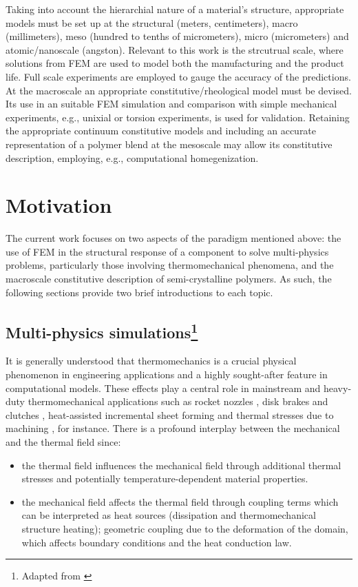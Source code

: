 Taking into account the hierarchial nature of a material's structure, appropriate models must be set up at the structural (meters, centimeters), macro (millimeters), meso (hundred to tenths of micrometers), micro (micrometers) and atomic/nanoscale (angston).
Relevant to this work is the strcutrual scale, where solutions from FEM are used to model both the manufacturing and the product life.
Full scale experiments are employed to gauge the accuracy of the predictions.
At the macroscale an appropriate constitutive/rheological model must be devised.
Its use in an suitable FEM simulation and comparison with simple mechanical experiments, e.g., unixial or torsion experiments, is used for validation.
Retaining the appropriate continuum constitutive models and including an accurate representation of a polymer blend at the mesoscale may allow its constitutive description, employing, e.g., computational homegenization.

\section{Motivation}

The current work focuses on two aspects of the paradigm mentioned above: the use of FEM in the structural response of a component to solve multi-physics problems, particularly those involving thermomechanical phenomena, and the macroscale constitutive description of semi-crystalline polymers.
As such, the following sections provide two brief introductions to each topic.

\subsection{Multi-physics simulations\protect\footnote{Adapted from \cite{vila-chaNumericalAssessmentPartitioned2023a}}}\label{sec:multi_physics_sims}

It is generally understood that thermomechanics is a crucial physical phenomenon in engineering applications and a highly sought-after feature in computational models.
These effects play a central role in mainstream and heavy-duty thermomechanical applications such as rocket nozzles \citep{kuhl2002ThermomechanicalAnalysisOptimization,danowski_monolithic_2013}, disk brakes and clutches \citep{yevtushenko2015NumericalAnalysisThermal}, heat-assisted incremental sheet forming \citep{liu2018HeatassistedIncrementalSheet} and thermal stresses due to machining \citep{elsheikh2021ComprehensiveReviewResidual}, for instance.
There is a profound interplay between the mechanical and the thermal field since:
\begin{itemize}
  \item the thermal field influences the mechanical field through additional thermal stresses and potentially temperature-dependent material properties.
  \item  the mechanical field affects the thermal field through coupling terms which can be interpreted as heat sources (dissipation and thermomechanical structure heating); geometric coupling due to the deformation of the domain, which affects boundary conditions and the heat conduction law.
\end{itemize}

